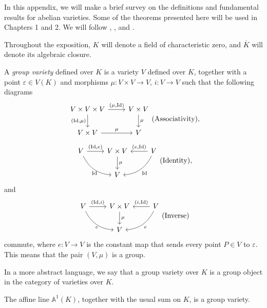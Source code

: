 In this appendix, we will make a brief survey on the definitions and fundamental results for abelian varieties. Some of the theorems presented here will be used in Chapters 1 and 2. We will follow \cite{Cornell_Silverman_Artin_1986}, \cite{Hartshorne_1977}, and \cite{Hindry_Silverman_2000}.

Throughout the exposition, $K$ will denote a field of characteristic zero, and $\overline{K}$ will denote its algebraic closure.
\begin{definition}
	A \emph{group variety} defined over $K$ is a variety $V$ defined over $K$, together with a point $\varepsilon\in V(K)$ and morphisms $\mu:V\times V\rightarrow V$, $i:V\rightarrow V$ such that the following diagrams
	\begin{equation*}
		\begin{tikzcd}
			V\times V\times V\arrow{r}{(\mu,\text{Id})}\arrow{d}[left]{(\text{Id},\mu)}
			&V\times V\arrow{d}{\mu}\\
			V\times V\arrow{r}{\mu}
			& V
		\end{tikzcd}\text{(Associativity)},
	\end{equation*}
	\vspace{20pt}
	\begin{equation*}
		\begin{tikzcd}
				V\arrow{r}{(\text{Id},e)}\arrow[bend right]{dr}[below]{\text{Id}}
				&V\times V\arrow{d}{\mu}
				&V\arrow{l}[above]{(e,\text{Id})}\arrow[bend left]{dl}{\text{Id}}\\
				&V
		\end{tikzcd}\text{(Identity)},
	\end{equation*}
	and
		\vspace{15pt}
	\begin{equation*}
		\begin{tikzcd}
			V\arrow{r}{(\text{Id},i)}\arrow[bend right]{dr}[below]{e}
			&V\times V\arrow{d}{\mu}
			&V\arrow{l}[above]{(i,\text{Id})}\arrow[bend left]{dl}{e}\\
			&V
		\end{tikzcd}\text{(Inverse)}
	\end{equation*}
	commute, where $e:V\rightarrow V$ is the constant map that sends every point $P\in V$ to $\varepsilon$. This means that the pair $(V,\mu)$ is a group.
\end{definition}
In a more abstract language, we say that a group variety over $K$ is a group object in the category of varieties over $K$.

\begin{example}
	The affine line $\mathbb{A}^1(K)$, together with the usual sum on $K$, is a group variety.
\end{example}

